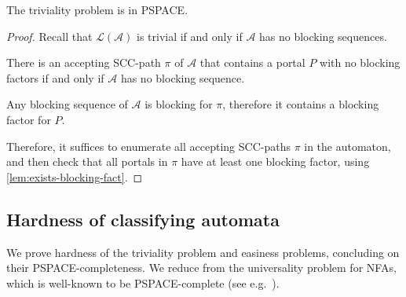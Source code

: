 \documentclass[letterpaper, USenglish, cleveref, autoref, thm-restate, numberwithinsect]{lipics-v2021}
\theoremstyle{theorem}
\theoremstyle{definition}
\newcommand{\Aa}{\mathcal{A}}
\newcommand{\lang}[1]{\mathcal{L}(#1)}
\newcommand{\PSPACE}{\textsf{PSPACE}\xspace}
\newcommand{\SCCpath}{\pi}
\begin{document}
\begin{proposition}\label{prop:trivial-PSPACE}
	The triviality problem is in \PSPACE.
\end{proposition}
\begin{proof}
	Recall that $\lang{\Aa}$ is trivial if and only if $\Aa$ has no blocking sequences.
	\begin{claim}
		There is an accepting SCC-path $\SCCpath$ of $\Aa$ that contains a portal $P$ with no blocking factors if and only if $\Aa$ has no blocking sequence.
	\end{claim}
	\begin{claimproof}
		Any blocking sequence of $\Aa$ is blocking for $\SCCpath$, therefore it contains a blocking factor for $P$.
	\end{claimproof}
	Therefore, it suffices to enumerate all accepting SCC-paths $\SCCpath$ in the automaton, and then check that all portals in $\SCCpath$ have at least one blocking factor, using \cref{lem:exists-blocking-fact}.
\end{proof}


\subsection{Hardness of classifying automata}\label{sec:pspace-hard}

We prove hardness of the triviality problem and easiness problems, concluding on their \PSPACE-completeness.
We reduce from the universality problem for NFAs, which is well-known to be \PSPACE-complete (see e.g.~\cite[Theorem 10.14]{aho1974design}).
\end{document}
